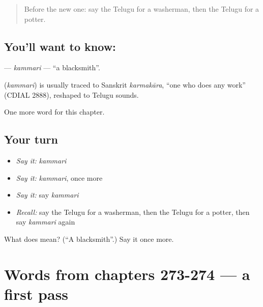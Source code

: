 \label{lesson:TE-C277-kammari}



\begin{quote}
Before the new one: say the Telugu for a washerman, then the Telugu for a potter.
\end{quote}

\subsection*{You'll want to know: }
\textbf{} — \emph{kammari} — \textquotedblleft{}a blacksmith\textquotedblright{}.

\begin{cousinweb}
\textbf{} (\emph{kammari}) is usually traced to Sanskrit \emph{karmakāra}, \textquotedblleft{}one who does any work\textquotedblright{} (CDIAL 2888), reshaped to Telugu sounds.
\end{cousinweb}

\begin{grammarlens}[title={What you've built}]
One more word for this chapter.
\end{grammarlens}

\subsection*{Your turn}
\begin{itemize}
\raggedright
  \item \emph{Say it:} \emph{kammari}
  \item \emph{Say it:} \emph{kammari}, once more
  \item \emph{Say it:} say \emph{kammari}
  \item \emph{Recall:} say the Telugu for a washerman, then the Telugu for a potter, then say \emph{kammari} again
\end{itemize}

\begin{tcolorbox}[breakable,colback=teal!4,colframe=teal!35!black,title={Before you move on}]
What does  mean? (\textquotedblleft{}A blacksmith\textquotedblright{}.) Say it once more.
\end{tcolorbox}
\section[(dialogue)]{Words from chapters 273-274 — a first pass}

\label{lesson:TE-R277-first-pass-words-from-chapters-273-274}



